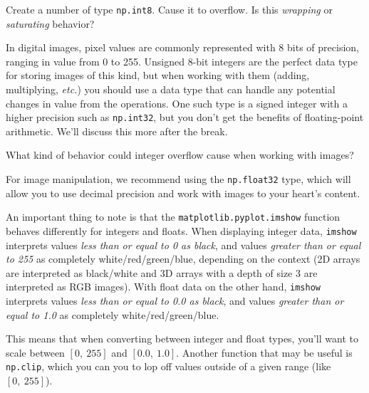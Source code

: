 \documentclass{tufte-handout}
\begin{document}
\bex
\item Create a number of type \lstinline{np.int8}. Cause it to overflow. Is this \emph{wrapping} or \emph{saturating} behavior?
\eex

In digital images, pixel values are commonly represented with 8 bits of precision, ranging in value from 0 to 255. Unsigned 8-bit integers are the perfect data type for storing images of this kind, but when working with them (adding, multiplying, \emph{etc.}) you should use a data type that can handle any potential changes in value from the operations. One such type is a signed integer with a higher precision such as \lstinline{np.int32}, but you don't get the benefits of floating-point arithmetic. We'll discuss this more after the break.

\bex
\item What kind of behavior could integer overflow cause when working with images?
\eex


For image manipulation, we recommend using the \lstinline{np.float32} type, which will allow you to use decimal precision and work with images to your heart's content.

An important thing to note is that the \lstinline{matplotlib.pyplot.imshow} function behaves differently for integers and floats. When displaying integer data, \lstinline{imshow} interprets values \emph{less than or equal to 0 as black}, and values \emph{greater than or equal to 255} as completely white/red/green/blue, depending on the context (2D arrays are interpreted as black/white and 3D arrays with a depth of size 3 are interpreted as RGB images). With float data on the other hand, \lstinline{imshow} interprets values \emph{less than or equal to 0.0 as black}, and values \emph{greater than or equal to 1.0} as completely white/red/green/blue.


This means that when converting between integer and float types, you'll want to scale between $[0,\ 255]$ and $[0.0,\ 1.0]$. Another function that may be useful is \lstinline{np.clip}, which you can you to lop off values outside of a given range (like $[0,\ 255]$).

\end{document}

